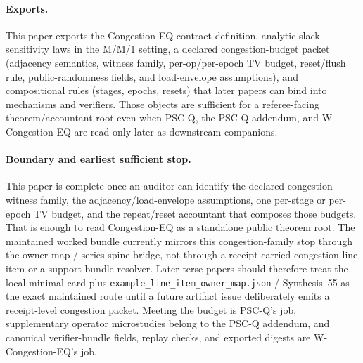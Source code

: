 \documentclass[11pt]{article}
\theoremstyle{definition}
\theoremstyle{remark}
\begin{document}
\paragraph{Exports.}
This paper exports the Congestion-EQ contract definition, analytic slack-sensitivity laws in the M/M/1 setting, a declared congestion-budget packet (adjacency semantics, witness family, per-op/per-epoch TV budget, reset/flush rule, public-randomness fields, and load-envelope assumptions), and compositional rules (stages, epochs, resets) that later papers can bind into mechanisms and verifiers. Those objects are sufficient for a referee-facing theorem/accountant root even when PSC-Q, the PSC-Q addendum, and W-Congestion-EQ are read only later as downstream companions.\cite{series:pscq,series:pscqaddendum,series:wcongeq}

\paragraph{Boundary and earliest sufficient stop.}
This paper is complete once an auditor can identify the declared congestion witness family, the adjacency/load-envelope assumptions, one per-stage or per-epoch TV budget, and the repeat/reset accountant that composes those budgets. That is enough to read Congestion-EQ as a standalone public theorem root. The maintained worked bundle currently mirrors this congestion-family stop through the owner-map / series-spine bridge, not through a receipt-carried congestion line item or a support-bundle resolver. Later terse papers should therefore treat the local minimal card plus \nolinkurl{example\_line\_item\_owner\_map.json} / Synthesis~55 as the exact maintained route until a future artifact issue deliberately emits a receipt-level congestion packet. Meeting the budget is PSC-Q's job, supplementary operator microstudies belong to the PSC-Q addendum, and canonical verifier-bundle fields, replay checks, and exported digests are W-Congestion-EQ's job.\cite{series:workedexample,series:seriesspines,series:pscq,series:pscqaddendum,series:wcongeq}
\end{document}
